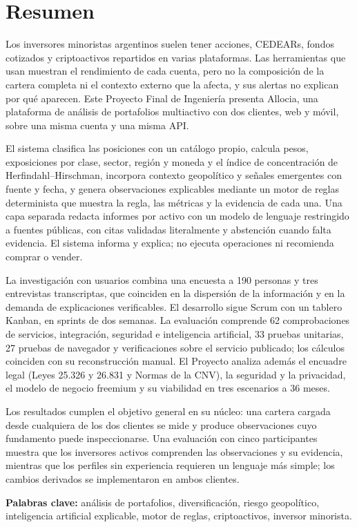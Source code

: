 \chapter*{Resumen}

Los inversores minoristas argentinos suelen tener acciones, CEDEARs, fondos cotizados y criptoactivos repartidos en varias plataformas. Las herramientas que usan muestran el rendimiento de cada cuenta, pero no la composición de la cartera completa ni el contexto externo que la afecta, y sus alertas no explican por qué aparecen. Este Proyecto Final de Ingeniería presenta Allocia, una plataforma de análisis de portafolios multiactivo con dos clientes, web y móvil, sobre una misma cuenta y una misma API.

El sistema clasifica las posiciones con un catálogo propio, calcula pesos, exposiciones por clase, sector, región y moneda y el índice de concentración de Herfindahl--Hirschman, incorpora contexto geopolítico y señales emergentes con fuente y fecha, y genera observaciones explicables mediante un motor de reglas determinista que muestra la regla, las métricas y la evidencia de cada una. Una capa separada redacta informes por activo con un modelo de lenguaje restringido a fuentes públicas, con citas validadas literalmente y abstención cuando falta evidencia. El sistema informa y explica; no ejecuta operaciones ni recomienda comprar o vender.

La investigación con usuarios combina una encuesta a 190 personas y tres entrevistas transcriptas, que coinciden en la dispersión de la información y en la demanda de explicaciones verificables. El desarrollo sigue Scrum con un tablero Kanban, en sprints de dos semanas. La evaluación comprende 62 comprobaciones de servicios, integración, seguridad e inteligencia artificial, 33 pruebas unitarias, 27 pruebas de navegador y verificaciones sobre el servicio publicado; los cálculos coinciden con su reconstrucción manual. El Proyecto analiza además el encuadre legal (Leyes 25.326 y 26.831 y Normas de la CNV), la seguridad y la privacidad, el modelo de negocio freemium y su viabilidad en tres escenarios a 36 meses.

Los resultados cumplen el objetivo general en su núcleo: una cartera cargada desde cualquiera de los dos clientes se mide y produce observaciones cuyo fundamento puede inspeccionarse. Una evaluación con cinco participantes muestra que los inversores activos comprenden las observaciones y su evidencia, mientras que los perfiles sin experiencia requieren un lenguaje más simple; los cambios derivados se implementaron en ambos clientes.

\medskip
\noindent\textbf{Palabras clave:} análisis de portafolios, diversificación, riesgo geopolítico, inteligencia artificial explicable, motor de reglas, criptoactivos, inversor minorista.
